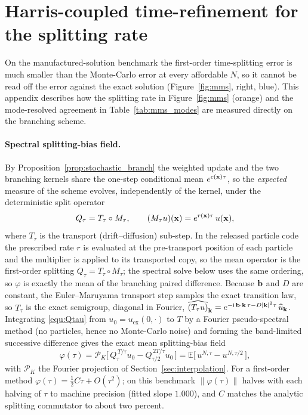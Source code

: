 \documentclass[a4paper,fleqn]{cas-sc}
\theoremstyle{definition}
\theoremstyle{remark}
\begin{document}
\section{Harris-coupled time-refinement for the splitting rate}
\label{app:harris}
On the manufactured-solution benchmark the first-order time-splitting error is much smaller than the
Monte-Carlo error at every affordable $N$, so it cannot be read off the error against the exact solution
(Figure~\ref{fig:mms}, right, blue). This appendix describes how the splitting rate in Figure~\ref{fig:mms}
(orange) and the mode-resolved agreement in Table~\ref{tab:mms_modes} are measured directly on the branching
scheme.

\paragraph{Spectral splitting-bias field.}
By Proposition~\ref{prop:stochastic_branch} the weighted update and the two branching kernels share the one-step
conditional mean $e^{c(\mathbf{x})\tau}$, so the \emph{expected} measure of the scheme evolves, independently of the
kernel, under the deterministic split operator
\begin{equation}\label{equ:Qtau}
Q_\tau = T_\tau\circ M_\tau,\qquad (M_\tau u)(\mathbf{x})=e^{r(\mathbf{x})\tau}\,u(\mathbf{x}),
\end{equation}
where $T_\tau$ is the transport (drift--diffusion) sub-step.  In the released particle code the prescribed rate
$r$ is evaluated at the pre-transport position of each particle and the multiplier is applied to its transported
copy, so the mean operator is the first-order splitting $Q_\tau=T_\tau\circ M_\tau$; the spectral solve below
uses the same ordering, so $\varphi$ is exactly the mean of the branching paired difference. Because $\mathbf b$ and $D$ are constant, the
Euler--Maruyama transport step samples the exact transition law, so $T_\tau$ is the exact semigroup, diagonal in
Fourier, $\widehat{(T_\tau u)}_{\mathbf k}=e^{-\mathrm i\,\mathbf b\cdot\mathbf k\,\tau-D|\mathbf k|^2\tau}\,\widehat u_{\mathbf k}$.
Integrating \eqref{equ:Qtau} from $u_0=u_{\mathrm{ex}}(0,\cdot)$ to $T$ by a Fourier pseudo-spectral method (no
particles, hence no Monte-Carlo noise) and forming the band-limited successive difference gives the exact mean
splitting-bias field
\begin{equation}\label{equ:phi}
\varphi(\tau)=\mathcal P_K\big[\,Q_\tau^{\,T/\tau}u_0-Q_{\tau/2}^{\,2T/\tau}u_0\,\big]
=\mathbb E\big[\,u^{N,\tau}-u^{N,\tau/2}\,\big],
\end{equation}
with $\mathcal P_K$ the Fourier projection of Section~\ref{sec:interpolation}. For a first-order method
$\varphi(\tau)=\tfrac12 C\tau+O(\tau^2)$; on this benchmark $\|\varphi(\tau)\|$ halves with each halving of
$\tau$ to machine precision (fitted slope $1.000$), and $C$ matches the analytic splitting commutator to about
two percent.
\end{document}
